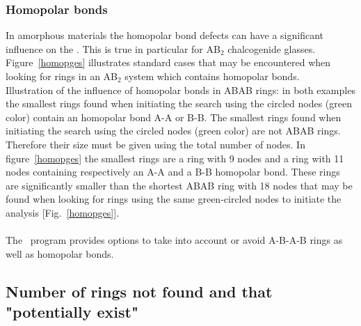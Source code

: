 \subsubsection{Homopolar bonds}
\label{homorings}

In amorphous materials the homopolar bond defects can have a significant influence on the \rstat. 
This is true in particular for AB$_2$ chalcogenide glasses. 
Figure~\ref{homopges} illustrates standard cases that may be encountered when looking for rings in an AB$_2$ system which contains homopolar bonds. \\ 
{Illustration of the  influence of homopolar bonds in ABAB rings: in both examples the smallest rings found 
when initiating the search using the circled nodes (green color) contain an homopolar bond A-A or B-B.}
\laf The smallest rings found when initiating the search using the circled nodes (green color) are not ABAB rings. 
Therefore their size must be given using the total number of nodes. 
In figure~\ref{homopges} the smallest rings are a ring with 9 nodes and a ring with 11 nodes containing respectively an A-A and a B-B homopolar bond. 
These rings are significantly smaller than the shortest ABAB ring with 18 nodes that may be found when looking for rings using the same green-circled nodes to initiate the analysis [Fig.~\ref{homopges}]. \\
\\
The \atomes\ program provides options to take into account or avoid A-B-A-B rings as well as homopolar bonds.

\subsection{Number of rings not found and that "potentially exist"}
\label{rpe}

